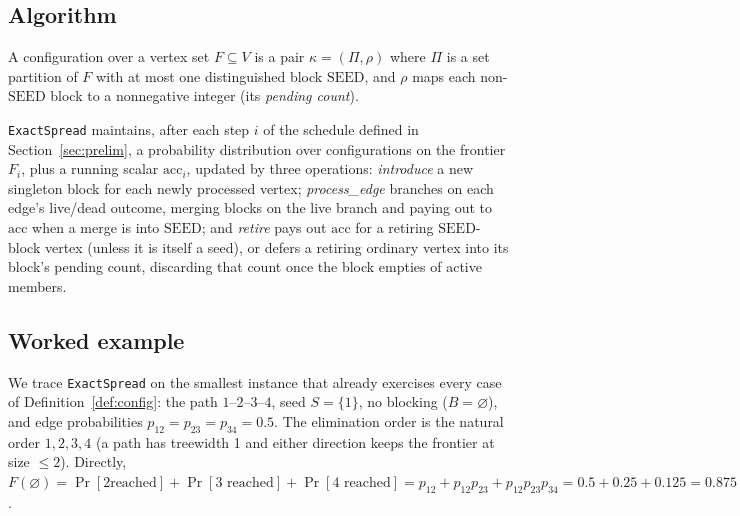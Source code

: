 \documentclass[ASNA,number]{USG}
\begin{document}
\subsection{Algorithm}\label{sec:twig-algo}

\begin{definition}[Configuration]\label{def:config}
A configuration over a vertex set $F\subseteq V$ is a pair
$\kappa=(\Pi,\rho)$ where $\Pi$ is a set partition of $F$ with at most one
distinguished block $\mathrm{SEED}$, and $\rho$ maps each non-$\mathrm{SEED}$
block to a nonnegative integer (its \emph{pending count}).
\end{definition}

\texttt{ExactSpread} maintains, after each step $i$ of the schedule defined
in Section~\ref{sec:prelim}, a probability distribution over configurations
on the frontier $F_i$, plus a running scalar $\mathrm{acc}_i$, updated by
three operations: \emph{introduce} a new singleton block for each newly
processed vertex; \emph{process\_edge} branches on each edge's live/dead
outcome, merging blocks on the live branch and paying out to $\mathrm{acc}$
when a merge is into $\mathrm{SEED}$; and \emph{retire} pays out $\mathrm{acc}$
for a retiring $\mathrm{SEED}$-block vertex (unless it is itself a seed), or
defers a retiring ordinary vertex into its block's pending count, discarding
that count once the block empties of active members.

\subsection{Worked example}\label{sec:twig-example}

We trace \texttt{ExactSpread} on the smallest instance that already
exercises every case of Definition~\ref{def:config}: the path
$1$--$2$--$3$--$4$, seed $S=\{1\}$, no blocking ($B=\varnothing$), and edge
probabilities $p_{12}=p_{23}=p_{34}=0.5$. The elimination order is the
natural order $1,2,3,4$ (a path has treewidth 1 and either direction keeps
the frontier at size $\le2$). Directly, $F(\varnothing)=\Pr[2\text{
reached}]+\Pr[3\text{ reached}]+\Pr[4\text{ reached}]
=p_{12}+p_{12}p_{23}+p_{12}p_{23}p_{34}=0.5+0.25+0.125=0.875$.
\end{document}
